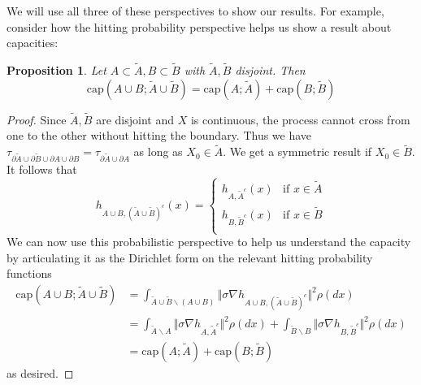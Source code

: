 \documentclass[english, aip, jcp, priprint, graphicx,floatfix]{revtex4-1}
\newtheorem{proposition}{Proposition}
\theoremstyle{plain}
\theoremstyle{definition}
\theoremstyle{plain}
\newcommand{\capac}[2]{\mathrm{cap}\left(#1;#2\right)}
\begin{document}
  We will use all three of these perspectives to show our results.  For example, consider how the hitting probability perspective helps us show a result about capacities:

\begin{proposition}\label{prop:capacity}
Let $A\subset \tilde A,B\subset \tilde B$ with $\tilde A,\tilde B$ disjoint.  Then 
\[
\capac{A\cup B}{\tilde A \cup \tilde B}=\capac{A}{\tilde A}+\capac{B}{\tilde B}
\]
\end{proposition}
\begin{proof}
Since $\tilde A,\tilde B$ are disjoint and $X$ is continuous, the process cannot cross from one to the other without hitting the boundary.  Thus we have $\tau_{\partial \tilde A\cup \partial \tilde B \cup \partial A \cup \partial B}=\tau_{\partial \tilde A \cup \partial A}$ as long as $X_0\in\tilde A$.  We get a symmetric result if $X_0\in \tilde B$.  It follows that
\[
h_{A\cup B,(\tilde A\cup\tilde B)^c}(x) = 
    \begin{cases}
    h_{A,\tilde A^c}(x) & \mbox{if }x\in \tilde A\\
    h_{B,\tilde B^c}(x) & \mbox{if }x\in \tilde B\\
    \end{cases}
\]
We can now use this probabilistic perspective to help us understand the capacity by articulating it as the Dirichlet form on the relevant hitting probability functions
\begin{align*}
\capac{A\cup B}{\tilde A \cup \tilde B} 
        &= \int_{\tilde A\cup \tilde B \backslash (A\cup B)} \Vert \sigma \nabla h_{A\cup B,(\tilde A \cup \tilde B)^c}\Vert^2\rho(dx) \\
        &= \int_{\tilde A \backslash A} \Vert \sigma \nabla h_{A,\tilde A^c}\Vert^2\rho(dx)
            +\int_{\tilde B \backslash B} \Vert \sigma \nabla h_{B,\tilde B^c}\Vert^2 \rho(dx) \\
        &= \capac{A}{\tilde A}+\capac{B}{\tilde B}
\end{align*}
as desired.
\end{proof}


                                                       
\end{document}
